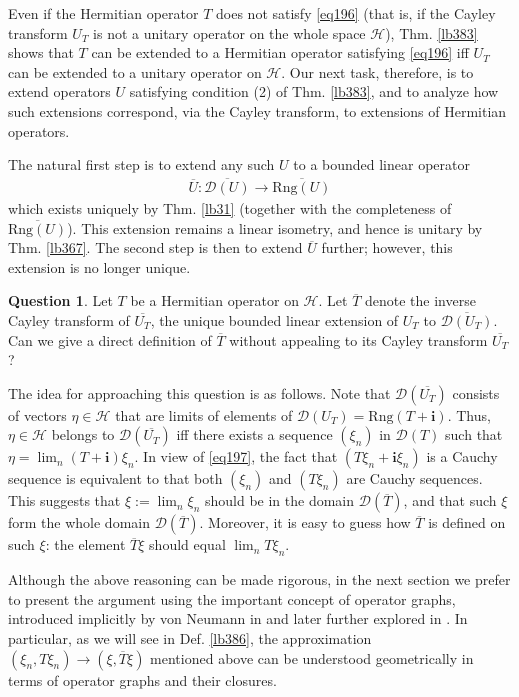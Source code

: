 \documentclass[12pt,b5paper,notitlepage]{article}
\theoremstyle{definition}
\newtheorem{question}[df]{Question}
\theoremstyle{plain}
\newcommand{\ovl}{\overline}
\newcommand{\Dom}{\mathscr{D}}
\newcommand{\im}{\mathbf{i}}
\newcommand{\Rng}{\mathrm{Rng}}
\newcommand{\MH}{\mathcal H}
\numberwithin{equation}{section}
\begin{document}
Even if the Hermitian operator $T$ does not satisfy \eqref{eq196} (that is, if the Cayley transform $U_T$ is not a unitary operator on the whole space $\MH$), Thm. \ref{lb383} shows that $T$ can be extended to a Hermitian operator satisfying \eqref{eq196} iff $U_T$ can be extended to a unitary operator on $\MH$. Our next task, therefore, is to extend operators $U$ satisfying condition (2) of Thm. \ref{lb383}, and to analyze how such extensions correspond, via the Cayley transform, to extensions of Hermitian operators.


The natural first step is to extend any such $U$ to a bounded linear operator
\begin{align*}
\ovl U:\ovl{\Dom(U)}\longrightarrow\ovl{\Rng(U)}
\end{align*}
which exists uniquely by Thm. \ref{lb31} (together with the completeness of $\ovl{\Rng(U)}$). This extension remains a linear isometry, and hence is unitary by Thm. \ref{lb367}. The second step is then to extend $\ovl U$ further; however, this extension is no longer unique.



\begin{question}\label{lb390}
Let $T$ be a Hermitian operator on $\MH$. Let $\ovl T$ denote the inverse Cayley transform of $\ovl{U_T}$, the unique bounded linear extension of $U_T$ to $\ovl{\Dom(U_T)}$. Can we give a direct definition of $\ovl T$ without appealing to its Cayley transform $\ovl{U_T}$?
\end{question}

The idea for approaching this question is as follows. Note that $\Dom(\ovl{U_T})$ consists of vectors $\eta\in\MH$ that are limits of elements of $\Dom(U_T)=\Rng(T+\im)$. Thus, $\eta\in\MH$ belongs to $\Dom(\ovl{U_T})$ iff there exists a sequence $(\xi_n)$ in $\Dom(T)$ such that $\eta=\lim_n (T+\im)\xi_n$. In view of \eqref{eq197}, the fact that $(T\xi_n+\im\xi_n)$ is a Cauchy sequence is equivalent to that both $(\xi_n)$ and $(T\xi_n)$ are Cauchy sequences. This suggests that $\xi:=\lim_n\xi_n$ should be in the domain $\Dom(\ovl T)$, and that such $\xi$ form the whole domain $\Dom(\ovl T)$. Moreover, it is easy to guess how $\ovl T$ is defined on such $\xi$: the element $\ovl T\xi$ should equal $\lim_n T\xi_n$. 


Although the above reasoning can be made rigorous, in the next section we prefer to present the argument using the important concept of operator graphs, introduced implicitly by von Neumann in \cite{vN29a} and later further explored in \cite{vN32b}. In particular, as we will see in Def. \ref{lb386}, the approximation $(\xi_n,T\xi_n)\rightarrow(\xi,\ovl T\xi)$ mentioned above can be understood geometrically in terms of operator graphs and their closures.
\end{document}

